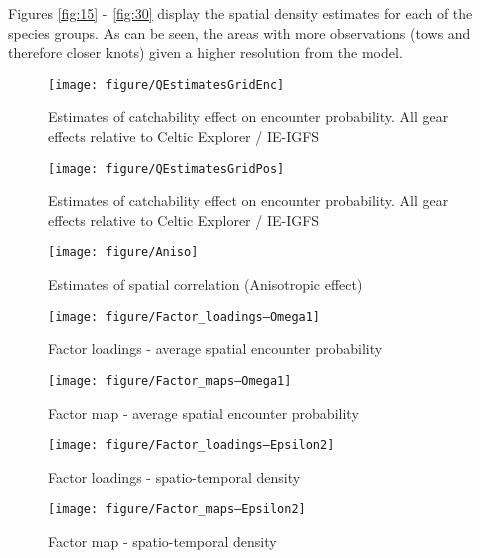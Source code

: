 \documentclass[11pt]{article}
\begin{document}
Figures \ref{fig:15} - \ref{fig:30} display the spatial density estimates for
each of the species groups. As can be seen, the areas with more observations
(tows and therefore closer knots) given a higher resolution from the model. \\

\begin{figure}[!phtb]
	\centering
\texttt{[image: figure/QEstimatesGridEnc]}
\caption{Estimates of catchability effect on encounter probability. All gear
	effects relative to Celtic Explorer / IE-IGFS}
\label{fig:5}
\end{figure}

\begin{figure}[!phtb]
	\centering
\texttt{[image: figure/QEstimatesGridPos]}
\caption{Estimates of catchability effect on encounter probability. All gear
	effects relative to Celtic Explorer / IE-IGFS}
\label{fig:6}
\end{figure}

\begin{figure}[!phtb]
	\centering
\texttt{[image: figure/Aniso]}
\caption{Estimates of spatial correlation (Anisotropic effect)}
\label{fig:7}
\end{figure}

\begin{figure}[!phtb]
	\centering
\texttt{[image: figure/Factor\_loadings--Omega1]}
\caption{Factor loadings - average spatial encounter probability}
\label{fig:9}
\end{figure}

\begin{landscape}
\begin{figure}[!phtb]
	\centering
\texttt{[image: figure/Factor\_maps--Omega1]}
\caption{Factor map - average spatial encounter probability}
\label{fig:10}
\end{figure}

\end{landscape}

\begin{figure}[!phtb]
	\centering
\texttt{[image: figure/Factor\_loadings--Epsilon2]}
\caption{Factor loadings - spatio-temporal density}
\label{fig:11}
\end{figure}

\begin{landscape}

\begin{figure}[!phtb]
	\centering
\texttt{[image: figure/Factor\_maps--Epsilon2]}
\caption{Factor map - spatio-temporal density}
\label{fig:12}
\end{figure}

\end{landscape}
\end{document}
